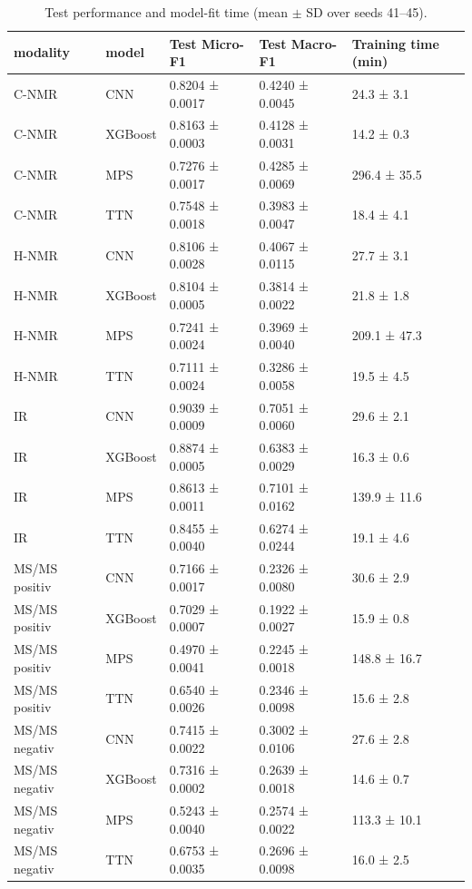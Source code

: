 \begin{table}
\caption{Test performance and model-fit time (mean $\pm$ SD over seeds 41--45).}
\label{tab:test-performance-time}
\begin{tabular}{lllll}
\toprule
modality & model & Test Micro-F1 & Test Macro-F1 & Training time (min) \\
\midrule
C-NMR & CNN & 0.8204 ± 0.0017 & 0.4240 ± 0.0045 & 24.3 ± 3.1 \\
C-NMR & XGBoost & 0.8163 ± 0.0003 & 0.4128 ± 0.0031 & 14.2 ± 0.3 \\
C-NMR & MPS & 0.7276 ± 0.0017 & 0.4285 ± 0.0069 & 296.4 ± 35.5 \\
C-NMR & TTN & 0.7548 ± 0.0018 & 0.3983 ± 0.0047 & 18.4 ± 4.1 \\
H-NMR & CNN & 0.8106 ± 0.0028 & 0.4067 ± 0.0115 & 27.7 ± 3.1 \\
H-NMR & XGBoost & 0.8104 ± 0.0005 & 0.3814 ± 0.0022 & 21.8 ± 1.8 \\
H-NMR & MPS & 0.7241 ± 0.0024 & 0.3969 ± 0.0040 & 209.1 ± 47.3 \\
H-NMR & TTN & 0.7111 ± 0.0024 & 0.3286 ± 0.0058 & 19.5 ± 4.5 \\
IR & CNN & 0.9039 ± 0.0009 & 0.7051 ± 0.0060 & 29.6 ± 2.1 \\
IR & XGBoost & 0.8874 ± 0.0005 & 0.6383 ± 0.0029 & 16.3 ± 0.6 \\
IR & MPS & 0.8613 ± 0.0011 & 0.7101 ± 0.0162 & 139.9 ± 11.6 \\
IR & TTN & 0.8455 ± 0.0040 & 0.6274 ± 0.0244 & 19.1 ± 4.6 \\
MS/MS positiv & CNN & 0.7166 ± 0.0017 & 0.2326 ± 0.0080 & 30.6 ± 2.9 \\
MS/MS positiv & XGBoost & 0.7029 ± 0.0007 & 0.1922 ± 0.0027 & 15.9 ± 0.8 \\
MS/MS positiv & MPS & 0.4970 ± 0.0041 & 0.2245 ± 0.0018 & 148.8 ± 16.7 \\
MS/MS positiv & TTN & 0.6540 ± 0.0026 & 0.2346 ± 0.0098 & 15.6 ± 2.8 \\
MS/MS negativ & CNN & 0.7415 ± 0.0022 & 0.3002 ± 0.0106 & 27.6 ± 2.8 \\
MS/MS negativ & XGBoost & 0.7316 ± 0.0002 & 0.2639 ± 0.0018 & 14.6 ± 0.7 \\
MS/MS negativ & MPS & 0.5243 ± 0.0040 & 0.2574 ± 0.0022 & 113.3 ± 10.1 \\
MS/MS negativ & TTN & 0.6753 ± 0.0035 & 0.2696 ± 0.0098 & 16.0 ± 2.5 \\
\bottomrule
\end{tabular}
\end{table}
